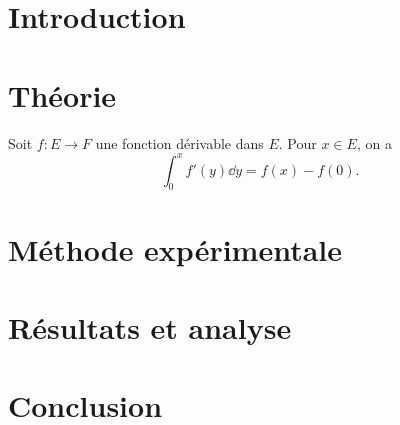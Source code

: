 \documentclass[a4paper, 11pt,twoside=true]{scrartcl} %
\begin{document}

\maketitle

\tableofcontents %
\newpage


\section{Introduction}
\lipsum[7]
\section{Théorie}
Soit $f:E\to F$ une fonction dérivable dans $E$. Pour $x\in E$, on a
\[
\int_0^x f'(y)\dd{y}=f(x)-f(0).
\]

\lipsum[19]
\section{Méthode expérimentale}
\lipsum[20]
\section{Résultats et analyse}
\lipsum[30]
\section{Conclusion}
\lipsum[20]



\begin{thebibliography}{widest entry}


\end{thebibliography}	
\end{document}
